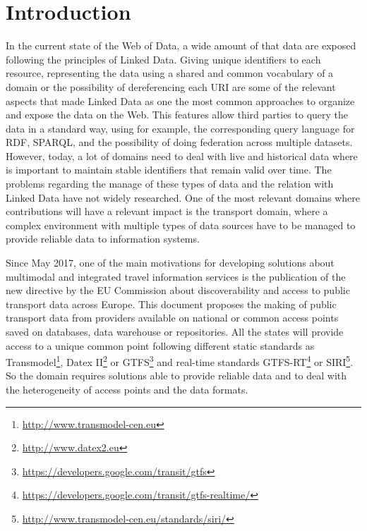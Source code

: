 \documentclass[sw]{iosart2x}
\begin{document}
\section{Introduction}\label{introduction} %
In the current state of the Web of Data, a wide amount of that data are exposed following the principles of Linked Data\cite{bizer2009linked}. Giving unique identifiers to each resource, representing the data using a shared and common vocabulary of a domain or the possibility of dereferencing each URI are some of the relevant aspects that made Linked Data as one the most common approaches to organize and expose the data on the Web\cite{heath2011linked}. This features allow third parties to query the data in a standard way, using for example, the corresponding query language for RDF, SPARQL\cite{prud2006sparql}, and the possibility of doing federation across multiple datasets\cite{buil2013federating}. However, today, a lot of domains need to deal with live and historical data where is important to maintain stable identifiers that remain valid over time. The problems regarding the manage of these types of data and the relation with Linked Data have not widely researched. One of the most relevant domains where contributions will have a relevant impact is the transport domain, where a complex environment with multiple types of data sources have to be managed to provide reliable data to information systems.

Since May 2017, one of the main motivations for developing solutions about multimodal and integrated travel information services is the publication of the new directive by the EU Commission about discoverability and access to public transport data across Europe. This document proposes the making of public transport data from providers available on national or common access points saved on databases, data warehouse or repositories. All the states will provide access to a unique common point following different static standards as Transmodel\footnote{\url{http://www.transmodel-cen.eu}}, Datex II\footnote{\url{http://www.datex2.eu}} or GTFS\footnote{\url{https://developers.google.com/transit/gtfs}} and real-time standards GTFS-RT\footnote{\url{https://developers.google.com/transit/gtfs-realtime/}} or SIRI\footnote{\url{http://www.transmodel-cen.eu/standards/siri/}}. So the domain requires solutions able to provide reliable data and to deal with the heterogeneity of access points and the data formats.
\end{document}
